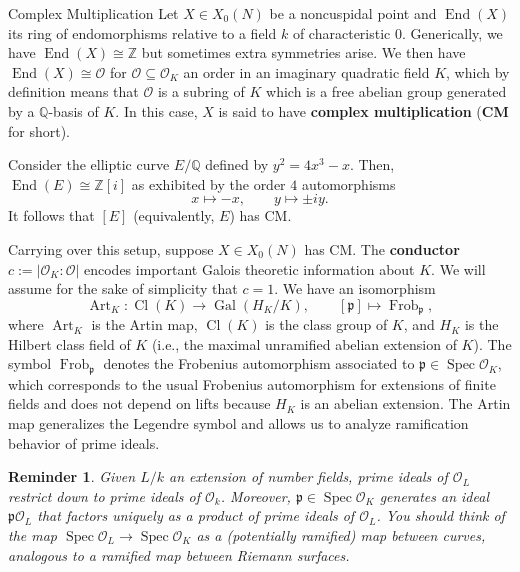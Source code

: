 \documentclass[aspectratio=1610]{beamer}
\renewcommand{\O}{\mathcal{O}}
\renewcommand{\subset}{\subseteq}
\newcommand{\Q}{\mathbb{Q}}
\newcommand{\Z}{\mathbb{Z}}
\newcommand{\iso}{\cong}
\newcommand{\mf}{\mathfrak}
\DeclareMathOperator{\Art}{Art}
\DeclareMathOperator{\Cl}{Cl}
\DeclareMathOperator{\End}{End}
\DeclareMathOperator{\Frob}{Frob}
\DeclareMathOperator{\Gal}{Gal}
\DeclareMathOperator{\Spec}{Spec}
\newtheorem{reminder}{Reminder}
\begin{document}
\begin{frame}{Complex Multiplication}
Let $X\in X_0(N)$ be a noncuspidal point and $\End(X)$ its ring of endomorphisms relative to a field $k$ of characteristic $0$. Generically, we have $\End(X)\iso\Z$ but sometimes extra symmetries arise. We then have $\End(X)\iso\O$ for $\O\subset\O_K$ an order in an imaginary quadratic field $K$, which by definition means that $\O$ is a subring of $K$ which is a free abelian group generated by a $\Q$-basis of $K$. In this case, $X$ is said to have \textbf{complex multiplication} (\textbf{CM} for short). 
\begin{example}
Consider the elliptic curve $E/\Q$ defined by $y^2=4x^3-x$. Then, $\End(E)\iso\Z[i]$ as exhibited by the order $4$ automorphisms 
$$x\mapsto-x,\qquad y\mapsto\pm iy.$$
It follows that $[E]$ (equivalently, $E$) has CM.
\end{example}
\end{frame}

\begin{frame}
Carrying over this setup, suppose $X\in X_0(N)$ has CM. The \textbf{conductor} $c:=|\O_K:\O|$ encodes important Galois theoretic information about $K$. We will assume for the sake of simplicity that $c=1$. We have an isomorphism 
$$\Art_K: \Cl(K)\to\Gal(H_K/K),\qquad[\mf{p}]\mapsto\Frob_{\mf{p}},$$
where $\Art_K$ is the Artin map, $\Cl(K)$ is the class group of $K$, and $H_K$ is the Hilbert class field of $K$ (i.e., the maximal unramified abelian extension of $K$). The symbol $\Frob_{\mf{p}}$ denotes the Frobenius automorphism associated to $\mf{p}\in\Spec\O_K$, which corresponds to the usual Frobenius automorphism for extensions of finite fields and does not depend on lifts because $H_K$ is an abelian extension. The Artin map generalizes the Legendre symbol and allows us to analyze ramification behavior of prime ideals. 
\begin{reminder}
Given $L/k$ an extension of number fields, prime ideals of $\O_L$ restrict down to prime ideals of $\O_k$. Moreover, $\mf{p}\in\Spec\O_K$ generates an ideal $\mf{p}\O_L$ that factors uniquely as a product of prime ideals of $\O_L$. You should think of the map $\Spec\O_L\to\Spec\O_K$ as a (potentially ramified) map between curves, analogous to a ramified map between Riemann surfaces.
\end{reminder}
\end{frame}
\end{document}
